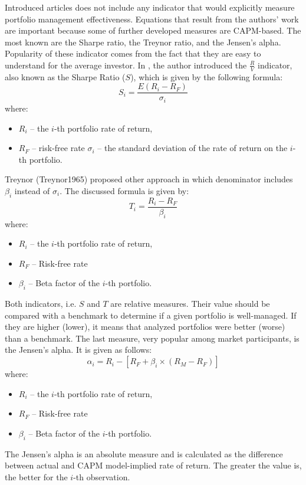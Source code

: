 \documentclass{pracamgr_wne}\usepackage[]{graphicx}\usepackage[]{color}
\begin{document}
Introduced articles does not include any indicator that would explicitly measure portfolio management effectiveness. 
Equations that result from the authors' work are important because some of further developed measures are CAPM-based. 
The most known are the Sharpe ratio, the Treynor ratio, and the Jensen's alpha. Popularity of these indicator comes from the fact that 
they are easy to understand for the average investor. \cite{Marte2012}
In \cite{Sharpe1966}, the author introduced the $\frac{R}{V}$ indicator, also known as the Sharpe Ratio ($S$), which is given by the following formula:
\begin{equation}
S_i=\frac{E(R_i-R_F)}{\sigma_i}
\end{equation}
where: 
\begin{itemize}
\item $R_i$ -- the $i$-th portfolio rate of return,
\item $R_F$ -- risk-free rate
$\sigma_i$ -- the standard deviation of the rate of return on the $i$-th portfolio.
\end{itemize}
Treynor (Treynor1965) proposed other approach in which denominator includes $\beta_i$ instead of $\sigma_i$. The discussed formula is given by:
\begin{equation}
T_i=\frac{R_i-R_F}{\beta_i}
\end{equation}
where:
\begin{itemize}
\item $R_i$ -- the $i$-th portfolio rate of return,
\item $R_F$ -- Risk-free rate
\item $\beta_i$ -- Beta factor of the $i$-th portfolio.
\end{itemize}
Both indicators, i.e. $S$ and $T$ are relative measures. Their value should be compared with a benchmark to determine if a given portfolio is well-managed. If they are
higher (lower), it means that analyzed portfolios were better (worse) than a benchmark.
The last measure, very popular among market participants, is the Jensen's alpha. It is given as follows:
\begin{equation}
\alpha_i=R_i-[R_F+\beta_i\times(R_M-R_F )]
\end{equation}
where:
\begin{itemize}
\item $R_i$ -- the $i$-th portfolio rate of return,
\item $R_F$ -- Risk-free rate
\item $\beta_i$ -- Beta factor of the $i$-th portfolio.
\end{itemize}
The Jensen's alpha is an absolute measure and is calculated as the difference between actual and CAPM model-implied rate of return. The greater the value is,
the better for the $i$-th observation.
\end{document}
